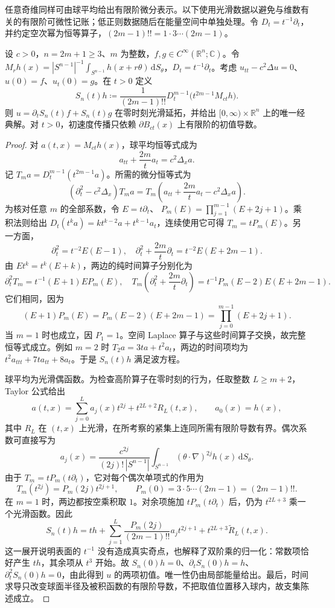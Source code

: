 \ProseParagraphBreak

任意奇维同样可由球平均给出有限阶微分表示。以下使用光滑数据以避免与维数有关的有限阶可微性记账；低正则数据随后在能量空间中单独处理。令 \(D_t=t^{-1}\partial_t\)，并约定空次幂为恒等算子，\((2m-1)!!=1\cdot3\cdots(2m-1)\)。

\begin{theorem}[奇维球面表示]\label{b2:thm:11-odd-wave}
设 \(c>0\)，\(n=2m+1\geq3\)、\(m\) 为整数，\(f,g\in C^\infty(\mathbb R^n;\mathbb C)\)。令 \(M_rh(x)=|S^{n-1}|^{-1}\int_{S^{n-1}}h(x+r\theta)\,\mathrm dS_\theta\)，\(D_t=t^{-1}\partial_t\)。考虑 \(u_{tt}-c^2\Delta u=0\)、\(u(0)=f\)、\(u_t(0)=g\)。在 \(t>0\) 定义
\begin{equation}\label{b2:eq:11-odd-wave}
 S_n(t)h\coloneqq\dfrac1{(2m-1)!!}
 D_t^{m-1}\bigl(t^{2m-1}M_{ct}h\bigr).
\end{equation}
则 \(u=\partial_tS_n(t)f+S_n(t)g\) 在零时刻光滑延拓，并给出 \([0,\infty)\times\mathbb R^n\) 上的唯一经典解。对 \(t>0\)，初速度传播只依赖 \(\partial B_{ct}(x)\) 上有限阶的初值导数。
\end{theorem}
\begin{proof}
对 \(a(t,x)=M_{ct}h(x)\)，球平均恒等式成为
\[
 a_{tt}+\dfrac{2m}{t}a_t=c^2\Delta_xa.
\]
记 \(T_ma=D_t^{m-1}(t^{2m-1}a)\)。所需的微分恒等式为
\[
 (\partial_t^2-c^2\Delta_x)T_ma
 =T_m\left(a_{tt}+\dfrac{2m}{t}a_t-c^2\Delta_xa\right).
\]
为核对任意 \(m\) 的全部系数，令 \(E=t\partial_t\)、
\(P_m(E)=\prod_{j=1}^{m-1}(E+2j+1)\)。乘积法则给出
\(D_t(t^ka)=kt^{k-2}a+t^{k-1}a_t\)，连续使用它可得 \(T_m=tP_m(E)\)。另一方面，
\[
 \partial_t^2=t^{-2}E(E-1),\quad
 \partial_t^2+\dfrac{2m}{t}\partial_t=t^{-2}E(E+2m-1).
\]
由 \(Et^k=t^k(E+k)\)，两边的纯时间算子分别化为
\[
 \partial_t^2T_m=t^{-1}(E+1)E P_m(E),\quad
 T_m\left(\partial_t^2+\dfrac{2m}{t}\partial_t\right)
 =t^{-1}P_m(E-2)E(E+2m-1).
\]
它们相同，因为
\[
 (E+1)P_m(E)=P_m(E-2)(E+2m-1)
 =\prod_{j=0}^{m-1}(E+2j+1).
\]
当 \(m=1\) 时也成立，因 \(P_1=1\)。空间 Laplace 算子与这些时间算子交换，故完整恒等式成立。例如 \(m=2\) 时 \(T_2a=3ta+t^2a_t\)，两边的时间项均为 \(t^2a_{ttt}+7ta_{tt}+8a_t\)。于是 \(S_n(t)h\) 满足波方程。

球平均为光滑偶函数。为检查高阶算子在零时刻的行为，任取整数 \(L\geq m+2\)，Taylor 公式给出
\[
 a(t,x)=\sum_{j=0}^{L}a_j(x)t^{2j}
             +t^{2L+2}R_L(t,x),\qquad a_0(x)=h(x),
\]
其中 \(R_L\) 在 \((t,x)\) 上光滑，在所考察的紧集上连同所需有限阶导数有界。偶次系数可直接写为
\[
 a_j(x)=\frac{c^{2j}}{(2j)!\,|S^{n-1}|}
       \int_{S^{n-1}}(\theta\cdot\nabla)^{2j}h(x)\,\mathrm{d}S_\theta.
\]
由于 \(T_m=tP_m(t\partial_t)\)，它对每个偶次单项式的作用为
\[
 T_m(t^{2j})=P_m(2j)t^{2j+1},\qquad
 P_m(0)=3\cdot5\cdots(2m-1)=(2m-1)!!.
\]
在 \(m=1\) 时，两边都按空乘积取 \(1\)。对余项施加 \(tP_m(t\partial_t)\) 后，仍为 \(t^{2L+3}\) 乘一个光滑函数。因此
\[
 S_n(t)h=t h+
 \sum_{j=1}^{L}\frac{P_m(2j)}{(2m-1)!!}a_jt^{2j+1}
 +t^{2L+3}\widetilde R_L(t,x).
\]
这一展开说明表面的 \(t^{-1}\) 没有造成真实奇点，也解释了双阶乘的归一化：常数项恰好产生 \(th\)，其余项从 \(t^3\) 开始。故 \(S_n(0)h=0\)、\(\partial_tS_n(0)h=h\)、\(\partial_t^2S_n(0)h=0\)，由此得到 \(u\) 的两项初值。唯一性仍由局部能量给出。最后，时间求导只改变球面半径及被积函数的有限阶导数，不把取值位置移入球内，故支集陈述成立。
\end{proof}

